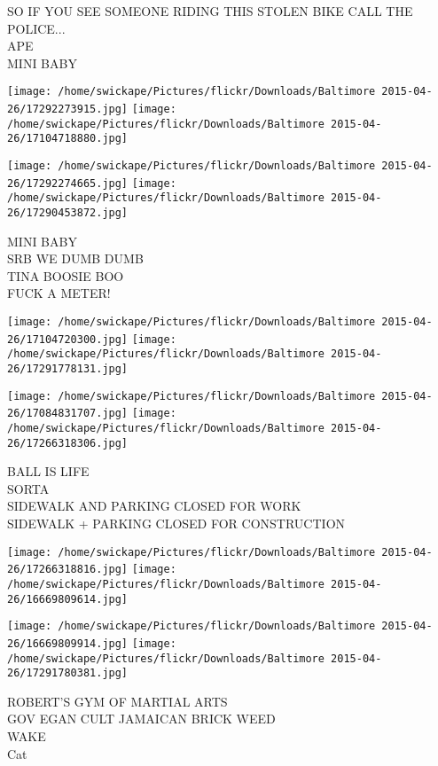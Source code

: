 \documentclass[10pt,letterpaper]{article}
\begin{document}
SO IF YOU SEE SOMEONE RIDING THIS STOLEN BIKE CALL THE POLICE...\\
APE\\
MINI BABY\\
\pagebreak

\texttt{[image: /home/swickape/Pictures/flickr/Downloads/Baltimore 2015-04-26/17292273915.jpg]}
\texttt{[image: /home/swickape/Pictures/flickr/Downloads/Baltimore 2015-04-26/17104718880.jpg]}

\texttt{[image: /home/swickape/Pictures/flickr/Downloads/Baltimore 2015-04-26/17292274665.jpg]}
\texttt{[image: /home/swickape/Pictures/flickr/Downloads/Baltimore 2015-04-26/17290453872.jpg]}

MINI BABY\\
SRB WE DUMB DUMB\\
TINA BOOSIE BOO\\
FUCK A METER!\\
\pagebreak

\texttt{[image: /home/swickape/Pictures/flickr/Downloads/Baltimore 2015-04-26/17104720300.jpg]}
\texttt{[image: /home/swickape/Pictures/flickr/Downloads/Baltimore 2015-04-26/17291778131.jpg]}

\texttt{[image: /home/swickape/Pictures/flickr/Downloads/Baltimore 2015-04-26/17084831707.jpg]}
\texttt{[image: /home/swickape/Pictures/flickr/Downloads/Baltimore 2015-04-26/17266318306.jpg]}

BALL IS LIFE\\
SORTA\\
SIDEWALK AND PARKING CLOSED FOR WORK\\
SIDEWALK + PARKING CLOSED FOR CONSTRUCTION\\
\pagebreak

\texttt{[image: /home/swickape/Pictures/flickr/Downloads/Baltimore 2015-04-26/17266318816.jpg]}
\texttt{[image: /home/swickape/Pictures/flickr/Downloads/Baltimore 2015-04-26/16669809614.jpg]}

\texttt{[image: /home/swickape/Pictures/flickr/Downloads/Baltimore 2015-04-26/16669809914.jpg]}
\texttt{[image: /home/swickape/Pictures/flickr/Downloads/Baltimore 2015-04-26/17291780381.jpg]}

ROBERT'S GYM OF MARTIAL ARTS\\
GOV EGAN CULT JAMAICAN BRICK WEED\\
WAKE\\
Cat\\
\pagebreak
\end{document}
